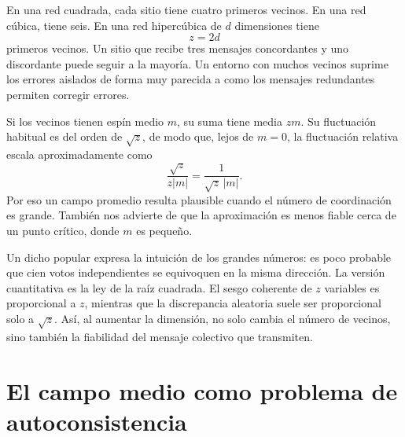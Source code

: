 En una red cuadrada, cada sitio tiene cuatro primeros vecinos. En una red cúbica, tiene seis. En una red hipercúbica de \(d\) dimensiones tiene
\begin{equation}
z=2d
\end{equation}
primeros vecinos. Un sitio que recibe tres mensajes concordantes y uno discordante puede seguir a la mayoría. Un entorno con muchos vecinos suprime los errores aislados de forma muy parecida a como los mensajes redundantes permiten corregir errores.

Si los vecinos tienen espín medio \(m\), su suma tiene media \(zm\). Su fluctuación habitual es del orden de \(\sqrt{z}\), de modo que, lejos de \(m=0\), la fluctuación relativa escala aproximadamente como
\begin{equation}
\frac{\sqrt{z}}{z|m|}
=\frac{1}{\sqrt{z}\,|m|}.
\end{equation}
Por eso un campo promedio resulta plausible cuando el número de coordinación es grande. También nos advierte de que la aproximación es menos fiable cerca de un punto crítico, donde \(m\) es pequeño.

Un dicho popular expresa la intuición de los grandes números: es poco probable que cien votos independientes se equivoquen en la misma dirección. La versión cuantitativa es la ley de la raíz cuadrada. El sesgo coherente de \(z\) variables es proporcional a \(z\), mientras que la discrepancia aleatoria suele ser proporcional solo a \(\sqrt{z}\). Así, al aumentar la dimensión, no solo cambia el número de vecinos, sino también la fiabilidad del mensaje colectivo que transmiten.

\begin{classroomqa}
\end{classroomqa}

\section{El campo medio como problema de autoconsistencia}

